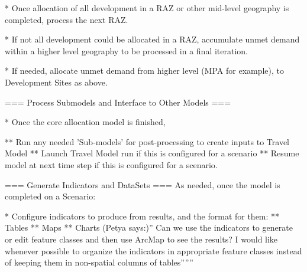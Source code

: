 * Once allocation of all development in a RAZ or other mid-level geography is completed, process the next RAZ.  

* If not all development could be allocated in a RAZ, accumulate unmet demand within a higher level geography to be processed in a final iteration.

* If needed, allocate unmet demand from higher level (MPA for example), to Development Sites as above.

=== Process Submodels and Interface to Other Models ===

* Once the core allocation model is finished,

** Run any needed 'Sub-models' for post-processing to create inputs to Travel Model
** Launch Travel Model run if this is configured for a scenario
** Resume model at next time step if this is configured for a scenario.

=== Generate Indicators and DataSets ===
As needed, once the model is completed on a Scenario:

* Configure indicators to produce from results, and the format for them:
** Tables
** Maps
** Charts
(Petya says:)'' Can we use the indicators to generate or edit feature classes and then use ArcMap to see the results? I would like whenever possible to organize the indicators in appropriate feature classes instead of keeping them in non-spatial columns of tables''''''


